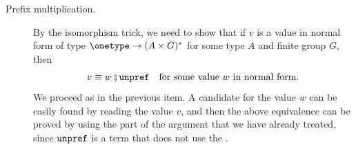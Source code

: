 \begin{description}
    
    
    \item[Prefix multiplication.] By the isomorphism trick, we need to show that if $v$ is a value in normal form of type $\onetype \to (A \times G)^*$ for some type $A$ and finite group $G$, then 
    \begin{align*}
    v  \equiv w\comp \unprefterm \quad \text{for some value $w$ in normal form.}
    \end{align*}
    We proceed as in the previous item. A  candidate for the value $w$ can be easily found by reading the value $v$, and then the above equivalence can be proved by using the part of the argument that we have already treated, since $\mathtt{unpref}$ is a term that does not use the .
\end{description}

